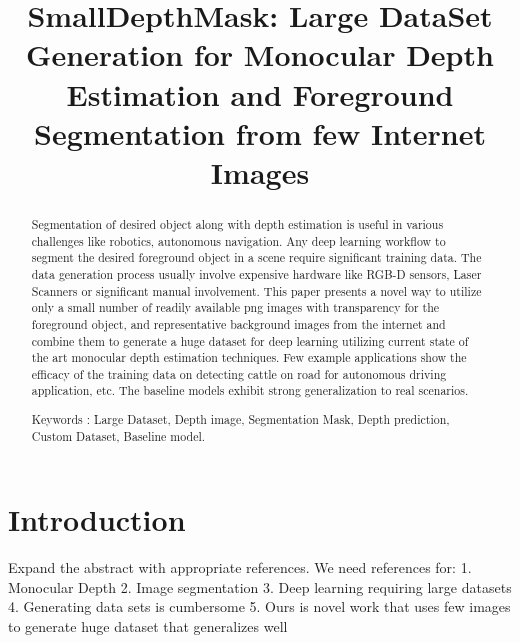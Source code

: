 \documentclass{article}
\title{SmallDepthMask: Large DataSet Generation for Monocular Depth Estimation and Foreground Segmentation from few Internet Images}
\begin{document}
\maketitle

\begin{abstract}
Segmentation of desired object along with depth estimation is useful in various challenges like robotics, autonomous navigation. 
Any deep learning workflow to segment the desired foreground object in a scene require significant training data.
The data generation process usually involve expensive hardware like RGB-D sensors, Laser Scanners or significant manual involvement. 
This paper presents a novel way to utilize only a small number of readily available png images with transparency for the foreground object, and representative
background images from the internet and combine them to generate a huge dataset for deep learning
utilizing current state of the art monocular depth estimation techniques. Few example applications show the efficacy of the training data on detecting 
cattle on road for autonomous driving application, etc. The baseline models exhibit strong generalization to real scenarios.

Keywords : Large Dataset, Depth image, Segmentation Mask, Depth prediction, Custom Dataset, Baseline model.
\end{abstract}

 

\section{Introduction}
Expand the abstract with appropriate references. We need references for:
1. Monocular Depth
2. Image segmentation
3. Deep learning requiring large datasets
4. Generating data sets is cumbersome
5. Ours is novel work that uses few images to generate huge dataset that generalizes well
\end{document}
